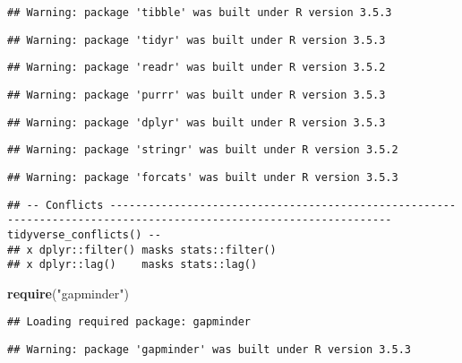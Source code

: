 \documentclass[]{article}
\newenvironment{Shaded}{\begin{snugshade}}{\end{snugshade}}
\newcommand{\KeywordTok}[1]{\textcolor[rgb]{0.13,0.29,0.53}{\textbf{#1}}}
\newcommand{\StringTok}[1]{\textcolor[rgb]{0.31,0.60,0.02}{#1}}
\newcommand{\NormalTok}[1]{#1}
\begin{document}
\begin{verbatim}
## Warning: package 'tibble' was built under R version 3.5.3
\end{verbatim}

\begin{verbatim}
## Warning: package 'tidyr' was built under R version 3.5.3
\end{verbatim}

\begin{verbatim}
## Warning: package 'readr' was built under R version 3.5.2
\end{verbatim}

\begin{verbatim}
## Warning: package 'purrr' was built under R version 3.5.3
\end{verbatim}

\begin{verbatim}
## Warning: package 'dplyr' was built under R version 3.5.3
\end{verbatim}

\begin{verbatim}
## Warning: package 'stringr' was built under R version 3.5.2
\end{verbatim}

\begin{verbatim}
## Warning: package 'forcats' was built under R version 3.5.3
\end{verbatim}

\begin{verbatim}
## -- Conflicts ------------------------------------------------------------------------------------------------------------------ tidyverse_conflicts() --
## x dplyr::filter() masks stats::filter()
## x dplyr::lag()    masks stats::lag()
\end{verbatim}

\begin{Shaded}
\begin{Highlighting}[]
\KeywordTok{require}\NormalTok{(}\StringTok{"gapminder"}\NormalTok{)}
\end{Highlighting}
\end{Shaded}

\begin{verbatim}
## Loading required package: gapminder
\end{verbatim}

\begin{verbatim}
## Warning: package 'gapminder' was built under R version 3.5.3
\end{verbatim}
\end{document}
